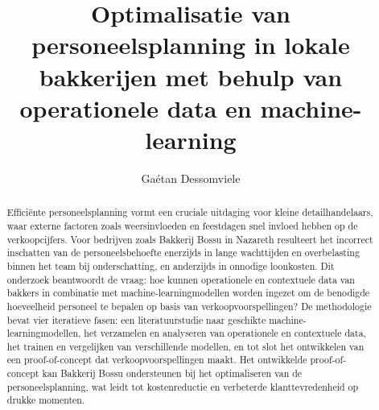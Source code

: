 \documentclass{hogent-article}
\title{Optimalisatie van personeelsplanning in lokale bakkerijen met behulp van operationele data en machine-learning}
\author{Gaétan Dessomviele}
\begin{document}
\begin{abstract}
  Efficiënte personeelsplanning vormt een cruciale uitdaging voor kleine detailhandelaars, waar externe factoren zoals weersinvloeden en feestdagen snel invloed hebben op de verkoopcijfers. Voor bedrijven zoals Bakkerij Bossu in Nazareth resulteert het incorrect inschatten van de personeelsbehoefte enerzijds in lange wachttijden en overbelasting binnen het team bij onderschatting, en anderzijds in onnodige loonkosten. Dit onderzoek beantwoordt de vraag: hoe kunnen operationele en contextuele data van bakkers in combinatie met machine-learningmodellen worden ingezet om de benodigde hoeveelheid personeel te bepalen op basis van verkoopvoorspellingen? De methodologie bevat vier iteratieve fasen: een literatuurstudie naar geschikte machine-learningmodellen, het verzamelen en analyseren van operationele en contextuele data, het trainen en vergelijken van verschillende modellen, en tot slot het ontwikkelen van een proof-of-concept dat verkoopvoorspellingen maakt. Het ontwikkelde proof-of-concept kan Bakkerij Bossu ondersteunen bij het optimaliseren van de personeelsplanning, wat leidt tot kostenreductie en verbeterde klanttevredenheid op drukke momenten.
\end{abstract}

\tableofcontents



\printbibliography[heading=bibintoc]
\end{document}
